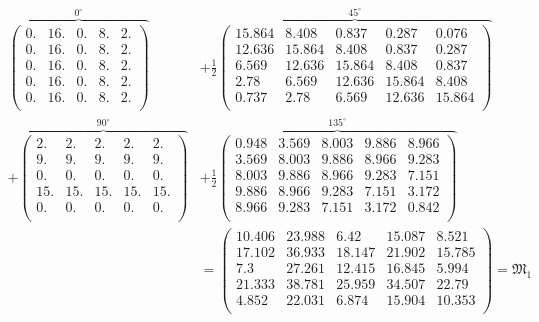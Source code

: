 \documentclass[slug=PET, room=Andreas-Schubert-Bau\,\ 424A, supervisor=Carsten\ Bittrich, coursedate=10.\ 01.\ 2020]{../../Lab_Report_LaTeX/lab_report}
\begin{document}
{\footnotesize
\setlength{\arraycolsep}{2.5pt}

\begin{align}
  \label{eq:simplerepr}
  \overbrace{\begin{pmatrix}
      0. & 16. & 0. & 8. & 2.\\
      0. & 16. & 0. & 8. & 2.\\
      0. & 16. & 0. & 8. & 2.\\
      0. & 16. & 0. & 8. & 2.\\
      0. & 16. & 0. & 8. & 2.\\
    \end{pmatrix}}^{0^\circ} & + \frac{1}{2}\overbrace{\begin{pmatrix}
      15.864 & 8.408 & 0.837 & 0.287 & 0.076\\
      12.636 & 15.864 & 8.408 & 0.837 & 0.287\\
      6.569 & 12.636 & 15.864 & 8.408 & 0.837\\
      2.78 & 6.569 & 12.636 & 15.864 & 8.408\\
      0.737 & 2.78 & 6.569 & 12.636 & 15.864\\
    \end{pmatrix}}^{45^\circ} \nonumber \\ + \overbrace{\begin{pmatrix}
      2. & 2. & 2. & 2. & 2.\\
      9. & 9. & 9. & 9. & 9.\\
      0. & 0. & 0. & 0. & 0.\\
      15. & 15. & 15. & 15. & 15.\\
      0. & 0. & 0. & 0. & 0.\\
    \end{pmatrix}}^{90^\circ} &+ \frac{1}{2}\overbrace{\begin{pmatrix}
      0.948 & 3.569 & 8.003 & 9.886 & 8.966\\
      3.569 & 8.003 & 9.886 & 8.966 & 9.283\\
      8.003 & 9.886 & 8.966 & 9.283 & 7.151\\
      9.886 & 8.966 & 9.283 & 7.151 & 3.172\\
      8.966 & 9.283 & 7.151 & 3.172 & 0.842\\
    \end{pmatrix}}^{135^\circ}\nonumber \\
  & = \begin{pmatrix}
  10.406 & 23.988 & 6.42 & 15.087 & 8.521\\
  17.102 & 36.933 & 18.147 & 21.902 & 15.785\\
  7.3 & 27.261 & 12.415 & 16.845 & 5.994\\
  21.333 & 38.781 & 25.959 & 34.507 & 22.79\\
  4.852 & 22.031 & 6.874 & 15.904 & 10.353\\
  \end{pmatrix} = \mathfrak{M}_1
\end{align}}
\end{document}
